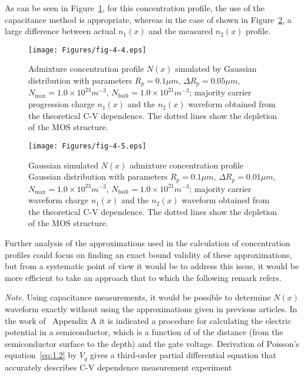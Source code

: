 \par As can be seen in Figure~\ref{fig:4.4}, for this concentration
profile, the use of the capacitance method is appropriate, whereas in
the case of shown in Figure~\ref{fig:4.5}, a large difference between
actual $n_{1}(x)$ and the measured $n_{2}(x)$ profile.

\begin{figure}[h!]\centering
  \texttt{[image: Figures/fig-4-4.eps]}
  \caption[Gaussian simulated impurity concentration
    distribution]{Admixture concentration profile $N(x)$ simulated by
    Gaussian distribution with parameters $R_{p}=0.1\mu m$, $\Delta
    R_{p}=0.05\mu m$, $N_{\max}=1.0\times 10^{23} m^{-3}$,
    $N_{bulk}=1.0\times10^{21}m^{-3}$; majority carrier progression
    charge $n_{1}(x)$ and the $n_{2}(x)$ waveform obtained from the
    theoretical C-V dependence. The dotted lines show the depletion of
    the MOS structure.}\label{fig:4.4}
\end{figure}

\begin{figure}[h!]\centering
  \texttt{[image: Figures/fig-4-5.eps]}
  \caption[Gaussian-simulated impurity concentration profile
    distribution]{Gaussian simulated $N(x)$ admixture concentration
    profile Gaussian distribution with parameters $R_{p}=0.1\mu m$,
    $\Delta R_{p}=0.01\mu m$, $N_{\max}=1.0\times10^{23}m^{-3}$,
    $N_{bulk}=1.0\times10^{21}m^{-3}$; majority carrier waveform
    charge $n_{1}(x)$ and the $n_{2}(x)$ waveform obtained from the
    theoretical C-V dependence. The dotted lines show the depletion of
    the MOS structure.}\label{fig:4.5}
\end{figure}

\par Further analysis of the approximations used in the calculation of
concentration profiles could focus on finding an exact bound validity
of these approximations, but from a systematic point of view it would
be to address this issue, it would be more efficient to take an
approach that to which the following remark refers.

\par\emph{Note.} Using capacitance measurements, it would be possible
to determine $N(x)$ waveform exactly without using the approximations
given in previous articles.  In the work of~\cite{4.4} Appendix A it
is indicated a procedure for calculating the electric potential in a
semiconductor, which is a function of of the distance (from the
semiconductor surface to the depth) and the gate voltage.  Derivation
of Poisson's equation~\ref{eq:1.2} by $V_{g}$ gives a third-order
partial differential equation that accurately describes C-V dependence
measurement experiment

